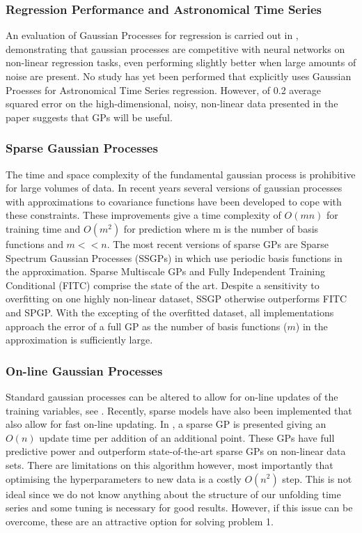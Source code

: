 \documentclass[11pt]{article}
\begin{document}
	\subsubsection{Regression Performance and Astronomical Time Series}
	An evaluation of Gaussian Processes for regression is carried out in \citep{rasmussen1996evaluation}, demonstrating that gaussian processes are competitive with neural networks on non-linear regression tasks, even performing slightly better when large amounts of noise are present. No study has yet been performed that explicitly uses Gaussian Proesses for Astronomical Time Series regression. However, of 0.2 average squared error on the high-dimensional, noisy, non-linear data presented in the paper suggests that GPs will be useful.
	
	\subsubsection{Sparse Gaussian Processes}
	The time and space complexity of the fundamental gaussian process is prohibitive for large volumes of data. In recent years several versions of gaussian processes with approximations to covariance functions have been developed to cope with these constraints. These improvements give a time complexity of $O(mn)$ for training time and $O(m^{2})$ for prediction where m is the number of basis functions and $m << n$. The most recent versions of sparse GPs are Sparse Spectrum Gaussian Processes (SSGPs) in \citep{rasmussen2010ssgpr} which use periodic basis functions in the approximation. Sparse Multiscale GPs \citep{walder2008sparse} and Fully Independent Training Conditional (FITC) \citep{snelson2005sgppi} comprise the state of the art. Despite a sensitivity to overfitting on one highly non-linear dataset, SSGP otherwise outperforms FITC and SPGP. With the excepting of the overfitted dataset, all implementations approach the error of a full GP as the number of basis functions ($m$) in the approximation is sufficiently large.

	\subsubsection{On-line Gaussian Processes}
	Standard gaussian processes can be altered to allow for on-line updates of the training variables, see \citep{osborne2007gaussian}. Recently, sparse models have also been implemented that also allow for fast on-line updating. In \citep{ranganathan2011online}, a sparse GP is presented giving an $O(n)$ update time per addition of an additional point. These GPs have full predictive power and outperform state-of-the-art sparse GPs on non-linear data sets. There are limitations on this algorithm however, most importantly that optimising the hyperparameters to new data is a costly $O(n^{2})$ step. This is not ideal since we do not know anything about the structure of our unfolding time series and some tuning is necessary for good results. However, if this issue can be overcome, these are an attractive option for solving problem 1.
	
\end{document}
